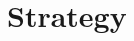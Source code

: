 \documentclass[Master.tex]{subfiles}
\begin{document}
	

\section{Strategy}\label{sec:Strategy}
    
\end{document}
